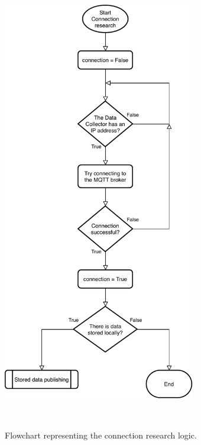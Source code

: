 \begin{figure}[h!]
\begin{minipage}[b]{8.5cm}
\centering
\includegraphics[width=0.75\textwidth]{images/flowconnection}
\caption{Flowchart representing the connection research logic.}
\label{fig:flowconnection}
\end{minipage}
\ \hspace{2mm} \hspace{3mm} \
\begin{minipage}[b]{8.5cm}
\centering

\end{minipage}
\end{figure}
